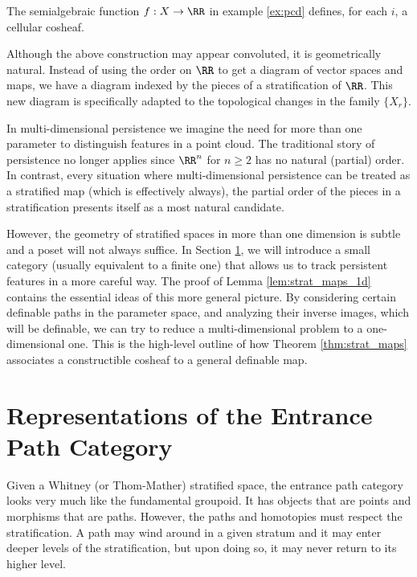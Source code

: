 \begin{cor}
	The semialgebraic function $f:X\to\RR$ in example \ref{ex:pcd} defines, for each $i$, a cellular cosheaf.
\end{cor}

Although the above construction may appear convoluted, it is geometrically natural. Instead of using the order on $\RR$ to get a diagram of vector spaces and maps, we have a diagram indexed by the pieces of a stratification of $\RR$. This new diagram is specifically adapted to the topological changes in the family $\{X_r\}$. 

In multi-dimensional persistence we imagine the need for more than one parameter to distinguish features in a point cloud. The traditional story of persistence no longer applies since $\RR^n$ for $n\geq 2$ has no natural (partial) order. In contrast, every situation where multi-dimensional persistence can be treated as a stratified map (which is effectively always), the partial order of the pieces in a stratification presents itself as a most natural candidate. 

However, the geometry of stratified spaces in more than one dimension is subtle and a poset will not always suffice. In Section \ref{subsubsec:path_cat}, we will introduce a small category (usually equivalent to a finite one) that allows us to track persistent features in a more careful way. The proof of Lemma \ref{lem:strat_maps_1d} contains the essential ideas of this more general picture. By considering certain definable paths in the parameter space, and analyzing their inverse images, which will be definable, we can try to reduce a multi-dimensional problem to a one-dimensional one. This is the high-level outline of how Theorem \ref{thm:strat_maps} associates a constructible cosheaf to a general definable map.

\section{Representations of the Entrance Path Category}
\label{subsubsec:path_cat}

Given a Whitney (or Thom-Mather) stratified space, the entrance path category looks very much like the fundamental groupoid. It has objects that are points and morphisms that are paths. However, the paths and homotopies must respect the stratification. A path may wind around in a given stratum and it may enter deeper levels of the stratification, but upon doing so, it may never return to its higher level.

